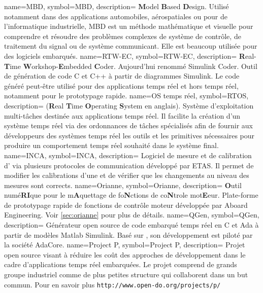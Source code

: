  {
	name=MBD,
	symbol=MBD,
	description=
	{
	  {\bf M}odel {\bf B}ased {\bf D}esign. Utilisé notamment dans des applications
	  automobiles, aérospatiales ou pour de l'informatique industrielle, MBD est un
	  méthode mathématique et visuelle pour comprendre et résoudre des problèmes
	   complexes de système de contrôle, de traitement du signal ou de système
	   communicant. Elle est beaucoup utilisée pour des logiciels embarqués.
	}
}
  {
	name=RTW-EC\up{\circledR},
	symbol=RTW-EC\up{\circledR},
	description=
	{
	  {\bf R}eal-{\bf T}ime {\bf W}orkshop-{\bf E}mbedded {\bf C}oder\up{\circledR}.
	  Aujourd'hui renommé Simulink Coder\up{\texttrademark}. Outil de génération de code
	  C et C++ à partir de diagrammes Simulink\up{\circledR}. Le code généré peut-être
	  utilisé pour des applications temps réel et hors temps réel, notamment pour le
	  prototypage rapide.
	}
}
  {
	name=OS temps réel,
	symbol=RTOS,
	description=
	{
	  ({\bf R}eal {\bf T}ime {\bf O}perating {\bf S}ystem en anglais). Système d'exploitation
	  multi-tâches destinée aux applications temps réel. Il facilite la création d'un système
	  temps réel via des ordonnances de tâches spécialisés afin de fournir aux développeurs
	  des systèmes temps réel les outils et les primitives nécessaires pour produire un
	  comportement temps réel souhaité dans le système final.
	}
}
  {
	name=INCA,
	symbol=INCA,
	description=
	{
	  Logiciel de mesure et de calibration d' via plusieurs protocoles de communication
	  développé par ETAS. Il permet de modifier les calibrations d'une  et de vérifier
	  que les changements au niveau des mesures sont corrects.
	}
}
  {
	name=Orianne,
	symbol=Orianne,
	description=
	{
	  {\bf O}util numé{\bf RI}que pour le m{\bf A}quettage de fo{\bf N}ctions de co{\bf N}trole mot{\bf E}eur.
	  Plate-forme de prototypage rapide de fonctions de contrôle moteur développée par Aboard Engineering. Voir \ref{sec:orianne}
	  pour plus de détails.
	}
}
  {
	name=QGen,
	symbol=QGen,
	description=
	{
	  Générateur open source de code embarqué temps réel en C et Ada à partir de modèles
	  Matlab\up{\textregistered} Simulink\up{\textregistered}. Basé sur
	  , son développement est piloté par la société AdaCore.
	}
}
  {
	name=Project P,
	symbol=Project P,
	description=
	{
	  Projet open source visant à réduire les coût des approches de
	  développement  dans le cadre d'applications temps réel
	  embarquées. Le projet comprend de grands groupe industriel comme de plus
	  petites structure qui collaborent dans un but commun. Pour en savoir plus
	  {\tt http://www.open-do.org/projects/p/}
	}
}

